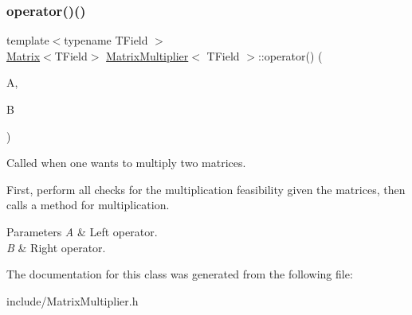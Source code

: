 \subsubsection{\texorpdfstring{operator()()}{operator()()}}
{\footnotesize\ttfamily template$<$typename T\+Field $>$ \\
\mbox{\hyperlink{classMatrix}{Matrix}}$<$T\+Field$>$ \mbox{\hyperlink{classMatrixMultiplier}{Matrix\+Multiplier}}$<$ T\+Field $>$\+::operator() (\begin{DoxyParamCaption}\item[{const \mbox{\hyperlink{classMatrix}{Matrix}}$<$ T\+Field $>$ \&}]{A,  }\item[{const \mbox{\hyperlink{classMatrix}{Matrix}}$<$ T\+Field $>$ \&}]{B }\end{DoxyParamCaption})\hspace{0.3cm}{\ttfamily [inline]}}



Called when one wants to multiply two matrices. 

First, perform all checks for the multiplication feasibility given the matrices, then calls a method for multiplication.


\begin{DoxyParams}{Parameters}
{\em A} & Left operator. \\
\hline
{\em B} & Right operator. \\
\hline
\end{DoxyParams}


The documentation for this class was generated from the following file\+:\begin{DoxyCompactItemize}
\item 
include/Matrix\+Multiplier.\+h\end{DoxyCompactItemize}
